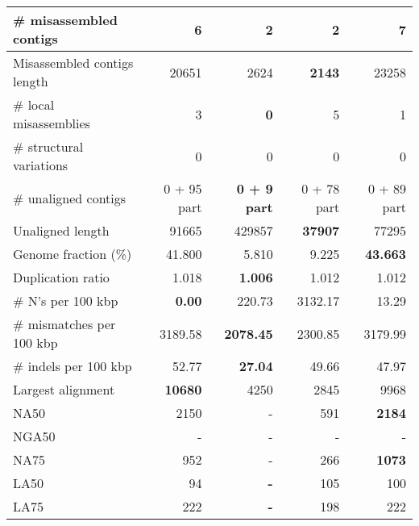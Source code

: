 \documentclass[12pt,a4paper]{article}
\begin{document}
\begin{table}[ht]
\begin{center}
\begin{tabular}{|l*{4}{|r}|}
\# misassembled contigs & 6 & {\bf 2} & {\bf 2} & 7 \\ \hline
Misassembled contigs length & 20651 & 2624 & {\bf 2143} & 23258 \\ \hline
\# local misassemblies & 3 & {\bf 0} & 5 & 1 \\ \hline
\# structural variations & 0 & 0 & 0 & 0 \\ \hline
\# unaligned contigs & 0 + 95 part & {\bf 0 + 9 part} & 0 + 78 part & 0 + 89 part \\ \hline
Unaligned length & 91665 & 429857 & {\bf 37907} & 77295 \\ \hline
Genome fraction (\%) & 41.800 & 5.810 & 9.225 & {\bf 43.663} \\ \hline
Duplication ratio & 1.018 & {\bf 1.006} & 1.012 & 1.012 \\ \hline
\# N's per 100 kbp & {\bf 0.00} & 220.73 & 3132.17 & 13.29 \\ \hline
\# mismatches per 100 kbp & 3189.58 & {\bf 2078.45} & 2300.85 & 3179.99 \\ \hline
\# indels per 100 kbp & 52.77 & {\bf 27.04} & 49.66 & 47.97 \\ \hline
Largest alignment & {\bf 10680} & 4250 & 2845 & 9968 \\ \hline
NA50 & 2150 & - & 591 & {\bf 2184} \\ \hline
NGA50 & - & - & - & - \\ \hline
NA75 & 952 & - & 266 & {\bf 1073} \\ \hline
LA50 & 94 & {\bf -} & 105 & 100 \\ \hline
LA75 & 222 & {\bf -} & 198 & 222 \\ \hline
\end{tabular}
\end{center}
\end{table}
\end{document}
